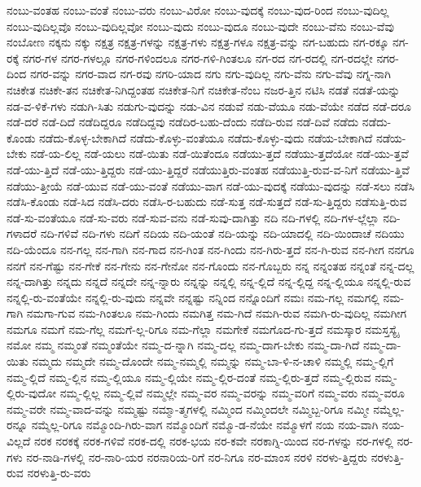 {ನಂಬು-ವಂತಹ
ನಂಬು-ವಂತೆ
ನಂಬು-ವರು
ನಂಬು-ವಿರೋ
ನಂಬು-ವುದಕ್ಕೆ
ನಂಬು-ವುದ-ರಿಂದ
ನಂಬು-ವುದಿಲ್ಲ
ನಂಬು-ವುದಿಲ್ಲವೊ
ನಂಬು-ವುದಿಲ್ಲವೋ
ನಂಬು-ವುದು
ನಂಬು-ವುದೂ
ನಂಬು-ವುದೇ
ನಂಬು-ವೆನು
ನಂಬು-ವೆವು
ನಂಬೋಣ
ನಕ್ಕನು
ನಕ್ಕು
ನಕ್ಷತ್ರ
ನಕ್ಷತ್ರ-ಗಳನ್ನು
ನಕ್ಷತ್ರ-ಗಳು
ನಕ್ಷತ್ರ-ಗಳೂ
ನಕ್ಷತ್ರ-ವನ್ನು
ನಗ-ಬಹುದು
ನಗ-ರಕ್ಕೂ
ನಗ-ರಕ್ಕೆ
ನಗರ-ಗಳ
ನಗರ-ಗಳಲ್ಲೂ
ನಗರ-ಗಳಿಂದಲೂ
ನಗರ-ಗಳಿ-ಗಿಂತಲೂ
ನಗ-ರದ
ನಗ-ರದಲ್ಲಿ
ನಗ-ರದಲ್ಲೇ
ನಗರ-ದಿಂದ
ನಗರ-ವನ್ನು
ನಗರ-ವಾದ
ನಗ-ರವು
ನಗರಿ-ಯಾದ
ನಗು
ನಗು-ವುದಿಲ್ಲ
ನಗು-ವೆನು
ನಗು-ವೆವು
ನಗ್ನ-ನಾಗಿ
ನಚಿಕೇತ
ನಚಿಕೇ-ತನ
ನಚಿಕೇತ-ನಿಗಿದ್ದಂತಹ
ನಚಿಕೇತ-ನಿಗೆ
ನಚಿಕೇತ-ನೆಂಬ
ನಜರ-ತ್ತಿನ
ನಟಿಸಿ
ನಡತೆ
ನಡತೆ-ಯನ್ನು
ನಡ-ವ-ಳಿಕೆ-ಗಳು
ನಡುಗಿ-ಸಿತು
ನಡುಗು-ವುದನ್ನು
ನಡು-ವಿನ
ನಡುವೆ
ನಡು-ವೆಯೂ
ನಡು-ವೆಯೇ
ನಡೆದ
ನಡೆ-ದರೂ
ನಡೆ-ದರೆ
ನಡೆ-ದಿದೆ
ನಡೆದಿದ್ದರೂ
ನಡೆದಿದ್ದವು
ನಡೆದಿರ-ಬಹು-ದೆಂದು
ನಡೆದಿ-ರುವ
ನಡೆ-ದಿವೆ
ನಡೆದು
ನಡೆದು-ಕೊಂಡು
ನಡೆದು-ಕೊಳ್ಳ-ಬೇಕಾಗಿದೆ
ನಡೆದು-ಕೊಳ್ಳು-ವಂತೆಯೂ
ನಡೆದು-ಕೊಳ್ಳು-ವುದು
ನಡೆಯ-ಬೇಕಾಗಿದೆ
ನಡೆಯ-ಬೇಕು
ನಡೆ-ಯ-ಲಿಲ್ಲ
ನಡೆ-ಯಲು
ನಡೆ-ಯಿತು
ನಡೆ-ಯಿತೆಂದೂ
ನಡೆಯು-ತ್ತದೆ
ನಡೆಯು-ತ್ತದೆಯೋ
ನಡೆ-ಯು-ತ್ತವೆ
ನಡೆ-ಯು-ತ್ತಿದೆ
ನಡೆ-ಯು-ತ್ತಿದ್ದರು
ನಡೆ-ಯು-ತ್ತಿದ್ದರೆ
ನಡೆಯುತ್ತಿರು-ವಂತಹ
ನಡೆಯುತ್ತಿ-ರುವ-ವ-ನಿಗೆ
ನಡೆಯು-ತ್ತಿವೆ
ನಡೆಯು-ತ್ತೀಯೆ
ನಡೆ-ಯುವ
ನಡೆ-ಯು-ವಂತೆ
ನಡೆಯು-ವಾಗ
ನಡೆ-ಯು-ವುದಕ್ಕೆ
ನಡೆಯು-ವುದನ್ನು
ನಡೆ-ಸಲು
ನಡೆಸಿ
ನಡೆಸಿ-ಕೊಂಡು
ನಡೆ-ಸಿದ
ನಡೆಸಿ-ದರು
ನಡೆಸಿ-ರ-ಬಹುದು
ನಡೆ-ಸುತ್ತ
ನಡೆ-ಸುತ್ತದೆ
ನಡೆ-ಸು-ತ್ತಿದ್ದರು
ನಡೆಸುತ್ತಿ-ರುವ
ನಡೆ-ಸು-ವಂತೆಯೂ
ನಡೆ-ಸು-ವರು
ನಡೆ-ಸುವ-ವನು
ನಡೆ-ಸುವು-ದಾಗಿತ್ತು
ನದಿ
ನದಿ-ಗಳಲ್ಲಿ
ನದಿ-ಗಳ-ಲ್ಲೆಲ್ಲಾ
ನದಿ-ಗಳಾದರೆ
ನದಿ-ಗಳಿವೆ
ನದಿ-ಗಳು
ನದಿಗೆ
ನದಿಯ
ನದಿ-ಯಂತೆ
ನದಿ-ಯನ್ನು
ನದಿ-ಯಾದಲ್ಲಿ
ನದಿ-ಯಿಂದಾಚೆ
ನದಿಯು
ನದಿ-ಯೆಂದೂ
ನನ-ಗಲ್ಲ
ನನ-ಗಾಗಿ
ನನ-ಗಾದ
ನನ-ಗಿಂತ
ನನ-ಗಿಂದು
ನನ-ಗಿರು-ತ್ತದೆ
ನನ-ಗಿ-ರುವ
ನನ-ಗೀಗ
ನನಗೂ
ನನಗೆ
ನನ-ಗೆಷ್ಟು
ನನ-ಗೇಕೆ
ನನ-ಗೇನು
ನನ-ಗೇನೋ
ನನ-ಗೊಂದು
ನನ-ಗೊಬ್ಬರು
ನನ್ನ
ನನ್ನಂತಹ
ನನ್ನಂತೆ
ನನ್ನ-ದಲ್ಲ
ನನ್ನ-ದಾಗಿತ್ತು
ನನ್ನದು
ನನ್ನದೆ
ನನ್ನದೇ
ನನ್ನ-ನ್ನಾರು
ನನ್ನನ್ನು
ನನ್ನಲ್ಲಿ
ನನ್ನ-ಲ್ಲಿದೆ
ನನ್ನ-ಲ್ಲಿದ್ದ
ನನ್ನ-ಲ್ಲಿಯೂ
ನನ್ನಲ್ಲಿ-ರುವ
ನನ್ನಲ್ಲಿ-ರು-ವಂತೆಯೇ
ನನ್ನಲ್ಲಿ-ರು-ವುದು
ನನ್ನವೇ
ನನ್ನಷ್ಟು
ನನ್ನಿಂದ
ನನ್ನೊಂದಿಗೆ
ನಮಃ
ನಮ-ಗಲ್ಲ
ನಮಗಲ್ಲಿ
ನಮ-ಗಾಗಿ
ನಮಗಾ-ಗುವ
ನಮ-ಗಿಂತಲೂ
ನಮ-ಗಿಂದು
ನಮಗಿತ್ತ
ನಮ-ಗಿದೆ
ನಮಗಿ-ರುವ
ನಮಗಿ-ರು-ವುದಿಲ್ಲ
ನಮಗೀಗ
ನಮಗೂ
ನಮಗೆ
ನಮ-ಗೆಲ್ಲ
ನಮಗೆ-ಲ್ಲ-ರಿಗೂ
ನಮ-ಗೆಲ್ಲಾ
ನಮಗೇಕೆ
ನಮಗೊದ-ಗು-ತ್ತದೆ
ನಮಸ್ಕಾರ
ನಮಸ್ತಸ್ಯೈ
ನಮೋ
ನಮ್ಮ
ನಮ್ಮಂತೆ
ನಮ್ಮಂತೆಯೇ
ನಮ್ಮ-ದ-ನ್ನಾಗಿ
ನಮ್ಮ-ದಲ್ಲ
ನಮ್ಮ-ದಾಗ-ಬೇಕು
ನಮ್ಮ-ದಾ-ಗಿದೆ
ನಮ್ಮ-ದಾ-ಯಿತು
ನಮ್ಮದು
ನಮ್ಮದೇ
ನಮ್ಮ-ದೊಂದೇ
ನಮ್ಮ-ನಮ್ಮಲ್ಲಿ
ನಮ್ಮನ್ನು
ನಮ್ಮ-ಬಾ-ಳಿ-ನ-ಚಾಳಿ
ನಮ್ಮಲ್ಲಿ
ನಮ್ಮ-ಲ್ಲಿಗೆ
ನಮ್ಮ-ಲ್ಲಿದೆ
ನಮ್ಮ-ಲ್ಲಿನ
ನಮ್ಮ-ಲ್ಲಿಯೂ
ನಮ್ಮ-ಲ್ಲಿಯೇ
ನಮ್ಮ-ಲ್ಲಿರ-ದಂತೆ
ನಮ್ಮ-ಲ್ಲಿರು-ತ್ತದೆ
ನಮ್ಮ-ಲ್ಲಿರುವ
ನಮ್ಮ-ಲ್ಲಿರು-ವುದೋ
ನಮ್ಮ-ಲ್ಲಿಲ್ಲ
ನಮ್ಮ-ಲ್ಲಿವೆ
ನಮ್ಮಲ್ಲೇ
ನಮ್ಮ-ವರ
ನಮ್ಮ-ವರನ್ನು
ನಮ್ಮ-ವರಿಗೆ
ನಮ್ಮ-ವರು
ನಮ್ಮ-ವರೂ
ನಮ್ಮ-ವರೇ
ನಮ್ಮ-ವಾದ-ವನ್ನು
ನಮ್ಮಷ್ಟು
ನಮ್ಮಾ-ತ್ಮಗಳಲ್ಲಿ
ನಮ್ಮಿಂದ
ನಮ್ಮಿಂದಲೇ
ನಮ್ಮಿಬ್ಬ-ರಿಗೂ
ನಮ್ಮೀ
ನಮ್ಮೆಲ್ಲ-ರನ್ನೂ
ನಮ್ಮೆಲ್ಲ-ರಿಗೂ
ನಮ್ಮೊಂದಿ-ಗಿರು-ವಾಗ
ನಮ್ಮೊಂದಿಗೆ
ನಮ್ಮೊ-ಡ-ನೆಯೇ
ನಮ್ಮೊಳಗೆ
ನಯ
ನಯ-ವಾಗಿ
ನಯ-ವಿಲ್ಲದೆ
ನರಕ
ನರಕಕ್ಕೆ
ನರಕ-ಗಳಿವೆ
ನರಕ-ದಲ್ಲಿ
ನರಕ-ಭಯ
ನರ-ಕವೇ
ನರಕಾಗ್ನಿ-ಯಿಂದ
ನರ-ಗಳನ್ನು
ನರ-ಗಳಲ್ಲಿ
ನರ-ಗಳು
ನರ-ನಾಡಿ-ಗಳಲ್ಲಿ
ನರ-ನಾರಿ-ಯರ
ನರನಾರಿಯ-ರಿಗೆ
ನರ-ನಿಗೂ
ನರ-ಮಾಂಸ
ನರಳಿ
ನರಳು-ತ್ತಿದ್ದರು
ನರಳುತ್ತಿ-ರುವ
ನರಳುತ್ತಿ-ರು-ವರು
}
